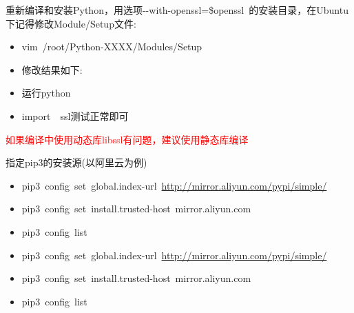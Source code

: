 \documentclass[10pt,a4paper]{article}
\begin{document}
重新编译和安装\textrm{Python}，用选项\textrm{-\/-with-openssl=\$openssl~}的安装目录，在\textrm{Ubuntu}下记得修改\textrm{Module/Setup}文件:~
\begin{itemize}
	\item \textrm{vim~/root/Python-XXXX/Modules/Setup}
	\item 修改结果如下:\\
    \item 运行\textrm{python}
    \item \textrm{import~~ssl}测试正常即可
\end{itemize}
\textcolor{red}{如果编译中使用动态库\textrm{libssl}有问题，建议使用静态库编译}

指定\textrm{pip3}的安装源(以阿里云为例)\\
\begin{itemize}
	\item \textrm{pip3~config~set~global.index-url~\url{http://mirror.aliyun.com/pypi/simple/}}
	\item \textrm{pip3~config~set~install.trusted-host~mirror.aliyun.com}
	\item \textrm{pip3~config~list}
	\item \textrm{pip3~config~set~global.index-url~\url{http://mirror.aliyun.com/pypi/simple/}}
	\item \textrm{pip3~config~set~install.trusted-host~mirror.aliyun.com}
	\item \textrm{pip3~config~list}
\end{itemize}
\end{document}
